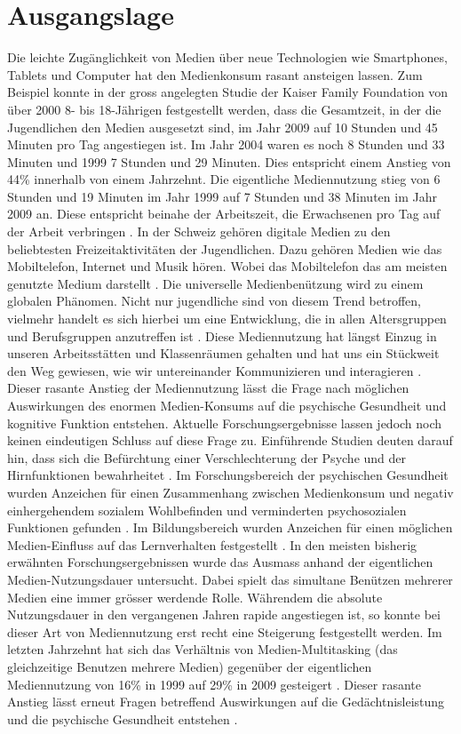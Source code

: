 \section{Ausgangslage}\label{section.einleitung.ausgangslage}
Die leichte Zugänglichkeit von Medien über neue Technologien wie Smartphones, Tablets und Computer hat den Medienkonsum rasant ansteigen lassen. Zum Beispiel konnte in der gross angelegten Studie der Kaiser Family Foundation \cite{Rideout2010} von über 2000 8- bis 18-Jährigen festgestellt werden, dass die Gesamtzeit, in der die Jugendlichen den Medien ausgesetzt sind, im Jahr 2009 auf 10 Stunden und 45 Minuten pro Tag angestiegen ist. Im Jahr 2004 waren es noch 8 Stunden und 33 Minuten und 1999 7 Stunden und 29 Minuten. Dies entspricht einem Anstieg von 44\% innerhalb von einem Jahrzehnt. Die eigentliche Mediennutzung stieg von 6 Stunden und 19 Minuten im Jahr 1999 auf 7 Stunden und 38 Minuten im Jahr 2009 an. Diese entspricht beinahe der Arbeitszeit, die Erwachsenen pro Tag auf der Arbeit verbringen \cite{Rideout2010}. In der Schweiz gehören digitale Medien zu den beliebtesten Freizeitaktivitäten der Jugendlichen. Dazu gehören Medien wie das Mobiltelefon, Internet und Musik hören. Wobei das Mobiltelefon das am meisten genutzte Medium darstellt \cite{Willemse2012}. Die universelle Medienbenützung wird zu einem globalen Phänomen. Nicht nur jugendliche sind von diesem Trend betroffen, vielmehr handelt es sich hierbei um eine Entwicklung, die in allen Altersgruppen und Berufsgruppen anzutreffen ist \cite{Rogers2009}. Diese Mediennutzung hat längst Einzug in unseren Arbeitsstätten und Klassenräumen gehalten und hat uns ein Stückweit den Weg gewiesen, wie wir untereinander Kommunizieren und interagieren \cite{Benson2002}. Dieser rasante Anstieg der Mediennutzung lässt die Frage nach möglichen Auswirkungen des enormen Medien-Konsums auf die psychische Gesundheit und kognitive Funktion entstehen. Aktuelle Forschungsergebnisse lassen jedoch noch keinen eindeutigen Schluss auf diese Frage zu. Einführende Studien deuten darauf hin, dass sich die Befürchtung einer Verschlechterung der Psyche und der Hirnfunktionen bewahrheitet \cite{Biocca2000, Roberts2008}. Im Forschungsbereich der psychischen Gesundheit wurden Anzeichen für einen Zusammenhang zwischen Medienkonsum und negativ einhergehendem sozialem Wohlbefinden und verminderten psychosozialen Funktionen gefunden \cite{Kraut1998, Moody2001}. Im Bildungsbereich wurden Anzeichen für einen möglichen Medien-Einfluss auf das Lernverhalten festgestellt \cite{Prensky2001}. In den meisten bisherig erwähnten Forschungsergebnissen wurde das Ausmass anhand der eigentlichen Medien-Nutzungsdauer untersucht. Dabei spielt das simultane Benützen mehrerer Medien eine immer grösser werdende Rolle. Währendem die absolute Nutzungsdauer in den vergangenen Jahren rapide angestiegen ist, so konnte bei dieser Art von Mediennutzung erst recht eine Steigerung festgestellt werden. Im letzten Jahrzehnt hat sich das Verhältnis von Medien-Multitasking (das gleichzeitige Benutzen mehrere Medien) gegenüber der eigentlichen Mediennutzung von 16\% in 1999 auf 29\% in 2009 gesteigert \cite{Rideout2010}. Dieser rasante Anstieg lässt erneut Fragen betreffend Auswirkungen auf die Gedächtnisleistung und die psychische Gesundheit entstehen \cite{Alzahabi2013}. 


